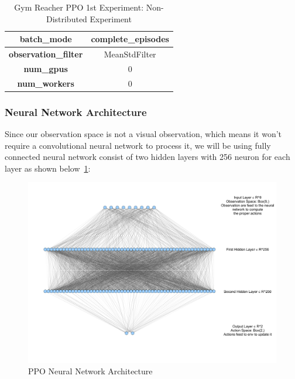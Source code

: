\begin{table}[!htb]
\begin{tabular}{|c|l|l|c|l|l|}
				\multicolumn{3}{|c|}{\textbf{batch\_mode}}                          & \multicolumn{3}{c|}{complete\_episodes}                                             \\ \hline
				\multicolumn{3}{|c|}{\textbf{observation\_filter}}                  & \multicolumn{3}{c|}{MeanStdFilter}                                                  \\ \hline
				\multicolumn{3}{|c|}{\cellcolor[HTML]{C0C0C0}\textbf{num\_gpus}}    & \multicolumn{3}{c|}{\cellcolor[HTML]{C0C0C0}0}                                      \\ \hline
				\multicolumn{3}{|c|}{\cellcolor[HTML]{C0C0C0}\textbf{num\_workers}} & \multicolumn{3}{c|}{\cellcolor[HTML]{C0C0C0}0}                                      \\ \hline
		\end{tabular}
		\caption{Gym Reacher PPO 1st Experiment: Non-Distributed Experiment}
		\label{tab:gym_reacher_ppo_1st_exp}
\end{table}


\subsubsection{Neural Network Architecture}
Since our observation space is not a visual observation, which means it won't require a convolutional neural network to process it, we will be using fully connected neural network consist of two hidden layers with 256 neuron for each layer as shown below~\ref{fig:ppo_nn}:

\begin{figure}[!htb]
		\centering
				\includegraphics[width=\linewidth]{figures/exps/1st_exp/ppo_nn}
				\caption{PPO Neural Network Architecture}
				\label{fig:ppo_nn}
\end{figure}


